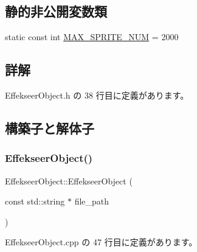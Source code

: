 \subsection*{静的非公開変数類}
\begin{DoxyCompactItemize}
\item 
static const int \mbox{\hyperlink{class_effekseer_object_a6edfdaac66134eee3264923075abb1f0}{M\+A\+X\+\_\+\+S\+P\+R\+I\+T\+E\+\_\+\+N\+UM}} = 2000
\end{DoxyCompactItemize}


\subsection{詳解}


 Effekseer\+Object.\+h の 38 行目に定義があります。



\subsection{構築子と解体子}
\mbox{\label{class_effekseer_object_a8e1e081f62efa87b31e00bcfd9cf1a45}} 
\subsubsection{\texorpdfstring{Effekseer\+Object()}{EffekseerObject()}}
{\footnotesize\ttfamily Effekseer\+Object\+::\+Effekseer\+Object (\begin{DoxyParamCaption}\item[{const std\+::string $\ast$}]{file\+\_\+path }\end{DoxyParamCaption})}



 Effekseer\+Object.\+cpp の 47 行目に定義があります。

